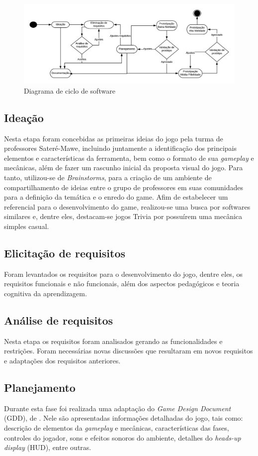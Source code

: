 \documentclass[12pt]{article}
\begin{document}
		\begin{figure}[!ht]
			\centering
			\includegraphics[width=1
			\textwidth]{IMG/diagramaDesenvolvimento.png}
			\caption{Diagrama de ciclo de software}
			\label{fig:diagram}
		\end{figure}
	
	\subsection{Ideação}
		Nesta etapa foram concebidas as primeiras ideias do jogo pela turma de professores Sateré-Mawe, incluindo juntamente a identificação dos principais elementos e características da ferramenta, bem como o formato de sua \textit{gameplay} e mecânicas, além de fazer um rascunho inicial da proposta visual do jogo. Para tanto, utilizou-se de \textit{Brainstorms}, para a criação de um ambiente de compartilhamento de ideias entre o grupo de professores em suas comunidades para a definição da temática e o enredo do game. Afim de estabelecer um referencial para o desenvolvimento do game, realizou-se uma busca por softwares similares e, dentre eles, destacam-se jogos Trivia por possuírem uma mecânica simples casual.
		
	\subsection{Elicitação de requisitos}
		Foram levantados os requisitos para o desenvolvimento do jogo, dentre eles, os requisitos funcionais e não funcionais, além dos aspectos pedagógicos e teoria cognitiva da aprendizagem.
	\subsection{Análise de requisitos}
		Nesta etapa os requisitos foram analisados gerando as funcionalidades e restrições. Foram necessárias novas discussões que resultaram em novos requisitos e adaptações dos requisitos anteriores.
		
	\subsection{Planejamento}
		Durante esta fase foi realizada uma adaptação do \textit{Game Design Document} (GDD), de \cite{rogers2014level} . Nele são apresentadas informações detalhadas do jogo, tais como: descrição de elementos da \textit{gameplay} e mecânicas, características das fases, controles do jogador, sons e efeitos sonoros do ambiente, detalhes do \textit{heads-up display} (HUD), entre outras.
	
\end{document}
